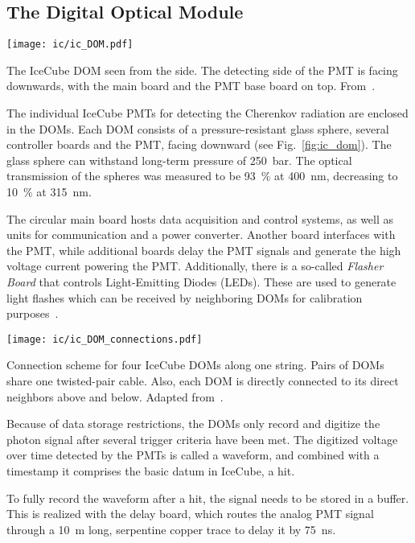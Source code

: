 \subsection{The Digital Optical Module}\label{DOM}
\begin{marginfigure}
    \texttt{[image: ic/ic\_DOM.pdf]}
    \caption[IceCube digital optical module]{The IceCube DOM seen from the side. The detecting side of the PMT is facing downwards, with the main board and the PMT base board on top. From~\cite{Aartsen2017}.}
\end{marginfigure}

The individual IceCube PMTs for detecting the Cherenkov radiation are enclosed in the DOMs. Each DOM consists of a pressure-resistant glass sphere, several controller boards and the PMT, facing downward (see Fig.~\ref{fig:ic_dom}). The glass sphere can withstand long-term pressure of \SI{250}{\bar}. The optical transmission of the spheres was measured to be \SI{93}{\percent} at \SI{400}{\nm}, decreasing to \SI{10}{\percent} at \SI{315}{\nm}.

The circular main board hosts data acquisition and control systems, as well as units for communication and a power converter. Another board interfaces with the PMT, while additional boards delay the PMT signals and generate the high voltage current powering the PMT. Additionally, there is a so-called \textit{Flasher Board} that controls Light-Emitting Diodes (LEDs). These are used to generate light flashes which can be received by neighboring DOMs for calibration purposes~.

\begin{marginfigure}
    \texttt{[image: ic/ic\_DOM\_connections.pdf]}
    \caption[IceCube DOM connections]{Connection scheme for four IceCube DOMs along one string. Pairs of DOMs share one twisted-pair cable. Also, each DOM is directly connected to its direct neighbors above and below. Adapted from~\cite{Aartsen2017}.}
\end{marginfigure}

Because of data storage restrictions, the DOMs only record and digitize the photon signal after several trigger criteria have been met. The digitized voltage over time detected by the PMTs is called a waveform, and combined with a timestamp it comprises the basic datum in IceCube, a hit.

To fully record the waveform after a hit, the signal needs to be stored in a buffer. This is realized with the delay board, which routes the analog PMT signal through a \SI{10}{\m} long, serpentine copper trace to delay it by \SI{75}{\ns}.

